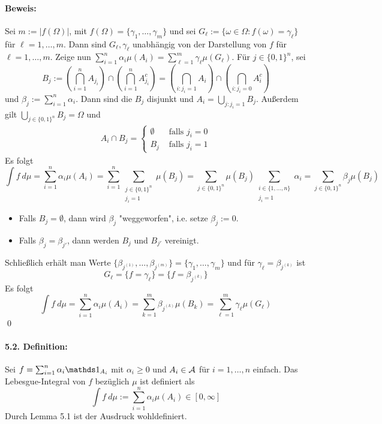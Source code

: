 \documentclass[12pt]{report}
\begin{document}
\paragraph{Beweis:}Sei $m:=|f(\Omega)|$, mit $f(\Omega)=\{\gamma_1,\hdots,\gamma_m\}$ und sei $G_\ell:=\{\omega\in\Omega:f(\omega)=\gamma_\ell\}$ f\"ur $\ell=1,\hdots,m$. Dann sind $G_\ell,\gamma_\ell$ unabh\"angig von der Darstellung von $f$ f\"ur $\ell=1,\hdots,m$. Zeige nun $\sum_{i=1}^n \alpha_i\mu(A_i)=\sum_{\ell=1}^m\gamma_\ell\mu(G_\ell)$. \newline
F\"ur $j\in\{0,1\}^n$, sei 
$$B_j:=\left(\bigcap_{i=1}^nA_{j_i}\right)\cap\left(\bigcap_{i=1}^nA_{j_i}^c\right)=\left(\bigcap_{i:j_i=1}A_i\right)\cap\left(\bigcap_{i:j_i=0}A_i^c\right)$$
und $\beta_j:=\sum_{i=1}^n\alpha_i$. Dann sind die $B_j$ disjunkt und $A_i=\bigcup_{j:j_i=1}B_j$. Au\ss{}erdem gilt $\bigcup_{j\in\{0,1\}^n}B_j=\Omega$ und 
\begin{align*}
    A_i\cap B_j=
    \begin{cases}
        \emptyset&\text{ falls }j_i=0\\
        B_j&\text{ falls }j_i=1
    \end{cases}
\end{align*}
Es folgt 
$$\int f\ d\mu=\sum_{i=1}^n\alpha_i\mu(A_i)=\sum_{i=1}^n\sum_{\substack{j\in\{0,1\}^n\\ j_i=1}}\mu(B_j)=\sum_{j\in\{0,1\}^n}\mu(B_j)\sum_{\substack{i\in\{1,\hdots,n\}\\ j_i=1}}\alpha_i=\sum_{j\in\{0,1\}^n}\beta_j\mu(B_j)$$
\begin{itemize}
    \item Falls $B_j=\emptyset$, dann wird $\beta_j$ "weggeworfen", i.e. setze $\beta_j:=0$.
    \item Falls $\beta_j=\beta_{j'}$, dann werden $B_j$ und $B_{j'}$ vereinigt.
\end{itemize}
Schlie\ss{}lich erh\"alt man Werte $\{\beta_{j^{(1)}},\hdots,\beta_{j^{(m)}}\}=\{\gamma_1,\hdots,\gamma_m\}$ und f\"ur $\gamma_\ell=\beta_{j^{(k)}}$ ist 
$$G_\ell=\{f=\gamma_\ell\}=\{f=\beta_{j^{(k)}}\}$$
 Es folgt
 $$\int f\ d\mu=\sum_{i=1}^n\alpha_i\mu(A_i)=\sum_{k=1}^m\beta_{j^{(k)}}\mu(B_k)=\sum_{\ell=1}^m\gamma_\ell\mu(G_\ell)$$
 \qed
 
 \paragraph{5.2. Definition:}Sei $f=\sum_{i=1}^n\alpha_i\ind{A_i}$ mit $\alpha_i\geq0$ und $A_i\in\mathcal{A}$ f\"ur $i=1,\hdots,n$ einfach. Das Lebesgue-Integral von $f$ bez\"uglich $\mu$ ist definiert als
 $$\int f\ d\mu:=\sum_{i=1}^n\alpha_i\mu(A_i)\in[0,\infty]$$
 Durch Lemma 5.1 ist der Ausdruck wohldefiniert.
 
\end{document}
